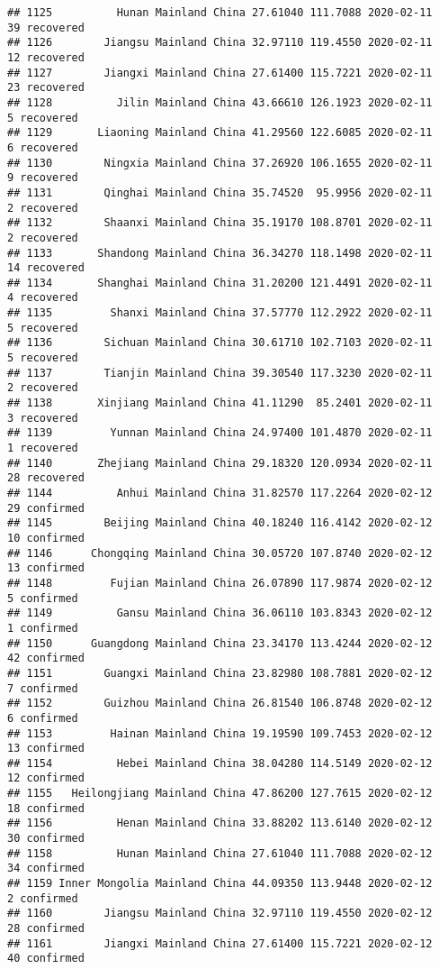 \documentclass[
]{article}
\begin{document}
\begin{verbatim}
## 1125          Hunan Mainland China 27.61040 111.7088 2020-02-11    39 recovered
## 1126        Jiangsu Mainland China 32.97110 119.4550 2020-02-11    12 recovered
## 1127        Jiangxi Mainland China 27.61400 115.7221 2020-02-11    23 recovered
## 1128          Jilin Mainland China 43.66610 126.1923 2020-02-11     5 recovered
## 1129       Liaoning Mainland China 41.29560 122.6085 2020-02-11     6 recovered
## 1130        Ningxia Mainland China 37.26920 106.1655 2020-02-11     9 recovered
## 1131        Qinghai Mainland China 35.74520  95.9956 2020-02-11     2 recovered
## 1132        Shaanxi Mainland China 35.19170 108.8701 2020-02-11     2 recovered
## 1133       Shandong Mainland China 36.34270 118.1498 2020-02-11    14 recovered
## 1134       Shanghai Mainland China 31.20200 121.4491 2020-02-11     4 recovered
## 1135         Shanxi Mainland China 37.57770 112.2922 2020-02-11     5 recovered
## 1136        Sichuan Mainland China 30.61710 102.7103 2020-02-11     5 recovered
## 1137        Tianjin Mainland China 39.30540 117.3230 2020-02-11     2 recovered
## 1138       Xinjiang Mainland China 41.11290  85.2401 2020-02-11     3 recovered
## 1139         Yunnan Mainland China 24.97400 101.4870 2020-02-11     1 recovered
## 1140       Zhejiang Mainland China 29.18320 120.0934 2020-02-11    28 recovered
## 1144          Anhui Mainland China 31.82570 117.2264 2020-02-12    29 confirmed
## 1145        Beijing Mainland China 40.18240 116.4142 2020-02-12    10 confirmed
## 1146      Chongqing Mainland China 30.05720 107.8740 2020-02-12    13 confirmed
## 1148         Fujian Mainland China 26.07890 117.9874 2020-02-12     5 confirmed
## 1149          Gansu Mainland China 36.06110 103.8343 2020-02-12     1 confirmed
## 1150      Guangdong Mainland China 23.34170 113.4244 2020-02-12    42 confirmed
## 1151        Guangxi Mainland China 23.82980 108.7881 2020-02-12     7 confirmed
## 1152        Guizhou Mainland China 26.81540 106.8748 2020-02-12     6 confirmed
## 1153         Hainan Mainland China 19.19590 109.7453 2020-02-12    13 confirmed
## 1154          Hebei Mainland China 38.04280 114.5149 2020-02-12    12 confirmed
## 1155   Heilongjiang Mainland China 47.86200 127.7615 2020-02-12    18 confirmed
## 1156          Henan Mainland China 33.88202 113.6140 2020-02-12    30 confirmed
## 1158          Hunan Mainland China 27.61040 111.7088 2020-02-12    34 confirmed
## 1159 Inner Mongolia Mainland China 44.09350 113.9448 2020-02-12     2 confirmed
## 1160        Jiangsu Mainland China 32.97110 119.4550 2020-02-12    28 confirmed
## 1161        Jiangxi Mainland China 27.61400 115.7221 2020-02-12    40 confirmed

\end{verbatim}
\end{document}
